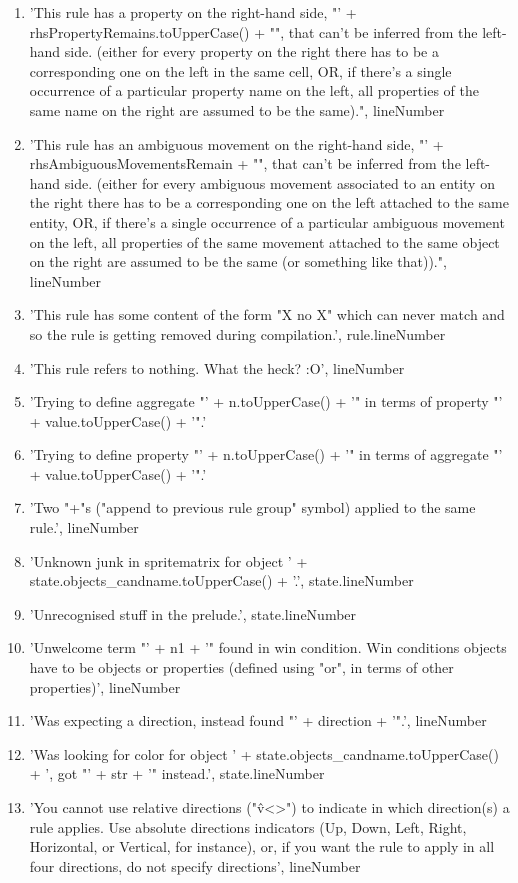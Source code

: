 \begin{enumerate}
    \item 'This rule has a property on the right-hand side, "' + rhsPropertyRemains.toUpperCase() + "", that can't be inferred from the left-hand side.  (either for every property on the right there has to be a corresponding one on the left in the same cell, OR, if there's a single occurrence of a particular property name on the left, all properties of the same name on the right are assumed to be the same).", lineNumber
    \item 'This rule has an ambiguous movement on the right-hand side, "' + rhsAmbiguousMovementsRemain + "", that can't be inferred from the left-hand side.  (either for every ambiguous movement associated to an entity on the right there has to be a corresponding one on the left attached to the same entity, OR, if there's a single occurrence of a particular ambiguous movement on the left, all properties of the same movement attached to the same object on the right are assumed to be the same (or something like that)).", lineNumber
    \item 'This rule has some content of the form "X no X" which can never match and so the rule is getting removed during compilation.', rule.lineNumber
    \item 'This rule refers to nothing.  What the heck? :O', lineNumber
    \item 'Trying to define aggregate "' + n.toUpperCase() + '" in terms of property "' + value.toUpperCase() + '".'
    \item 'Trying to define property "' + n.toUpperCase() + '" in terms of aggregate "' + value.toUpperCase() + '".'
    \item 'Two "+"s ("append to previous rule group" symbol) applied to the same rule.', lineNumber
    \item 'Unknown junk in spritematrix for object ' + state.objects\_candname.toUpperCase() + '.', state.lineNumber
    \item 'Unrecognised stuff in the prelude.', state.lineNumber
    \item 'Unwelcome term "' + n1 + '" found in win condition. Win conditions objects have to be objects or properties (defined using "or", in terms of other properties)', lineNumber
    \item 'Was expecting a direction, instead found "' + direction + '".', lineNumber
    \item 'Was looking for color for object ' + state.objects\_candname.toUpperCase() + ', got "' + str + '" instead.', state.lineNumber
    \item 'You cannot use relative directions ("\^v<>") to indicate in which direction(s) a rule applies.  Use absolute directions indicators (Up, Down, Left, Right, Horizontal, or Vertical, for instance), or, if you want the rule to apply in all four directions, do not specify directions', lineNumber

\end{enumerate}
